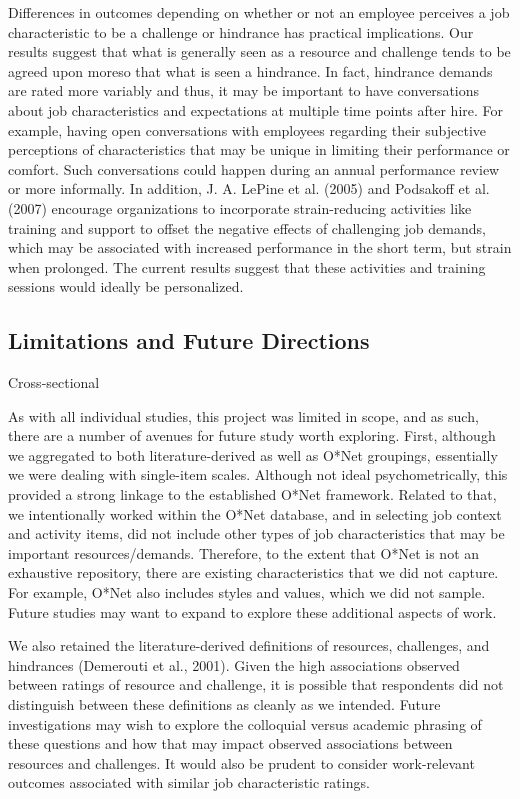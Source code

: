 \documentclass[
  man,mask]{apa7}
\begin{document}
Differences in outcomes depending on whether or not an employee perceives a job characteristic to be a challenge or hindrance has practical implications. Our results suggest that what is generally seen as a resource and challenge tends to be agreed upon moreso that what is seen a hindrance. In fact, hindrance demands are rated more variably and thus, it may be important to have conversations about job characteristics and expectations at multiple time points after hire. For example, having open conversations with employees regarding their subjective perceptions of characteristics that may be unique in limiting their performance or comfort. Such conversations could happen during an annual performance review or more informally. In addition, J. A. LePine et al. (2005) and Podsakoff et al. (2007) encourage organizations to incorporate strain-reducing activities like training and support to offset the negative effects of challenging job demands, which may be associated with increased performance in the short term, but strain when prolonged. The current results suggest that these activities and training sessions would ideally be personalized.

\hypertarget{limitations-and-future-directions}{%
\subsection{Limitations and Future Directions}\label{limitations-and-future-directions}}

Cross-sectional

As with all individual studies, this project was limited in scope, and as such, there are a number of avenues for future study worth exploring. First, although we aggregated to both literature-derived as well as O*Net groupings, essentially we were dealing with single-item scales. Although not ideal psychometrically, this provided a strong linkage to the established O*Net framework. Related to that, we intentionally worked within the O*Net database, and in selecting job context and activity items, did not include other types of job characteristics that may be important resources/demands. Therefore, to the extent that O*Net is not an exhaustive repository, there are existing characteristics that we did not capture. For example, O*Net also includes styles and values, which we did not sample. Future studies may want to expand to explore these additional aspects of work.

We also retained the literature-derived definitions of resources, challenges, and hindrances (Demerouti et al., 2001). Given the high associations observed between ratings of resource and challenge, it is possible that respondents did not distinguish between these definitions as cleanly as we intended. Future investigations may wish to explore the colloquial versus academic phrasing of these questions and how that may impact observed associations between resources and challenges. It would also be prudent to consider work-relevant outcomes associated with similar job characteristic ratings.
\end{document}
